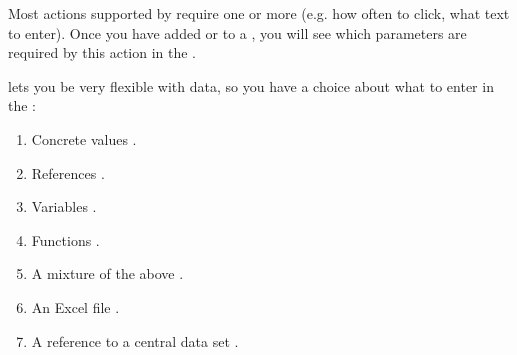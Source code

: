  
Most actions supported by \app{} require one or more  (e.g. how often to click, what text to enter). 
Once you have added \gdcases{} or \gdsteps{} to a \gdcase{}, you will see which parameters are required by this action in the \gdpropview{}. 


\app{} lets you be very flexible with data, so you have a choice about what to enter in the \gdpropview{}:

\begin{enumerate}
\item Concrete values .
\item References .
\item Variables .
\item Functions .
\item A mixture of the above .
\item An Excel file .
\item A reference to a central data set .
\end{enumerate}














